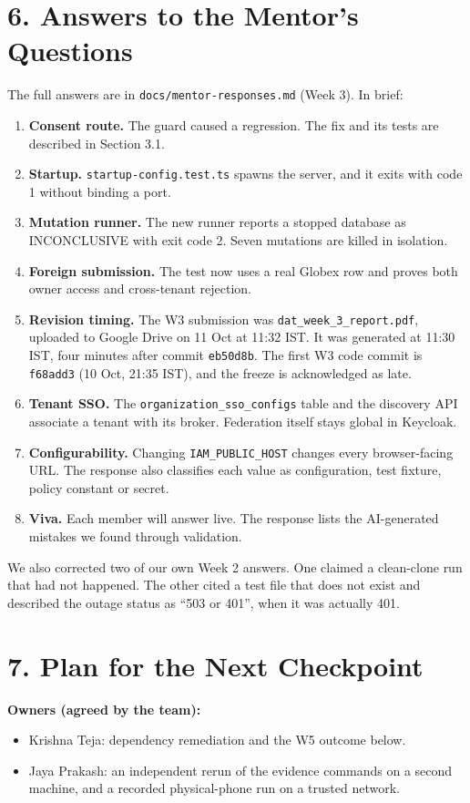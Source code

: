 \documentclass{article}
\begin{document}
\section*{6. Answers to the Mentor's Questions}
The full answers are in \texttt{docs/mentor-responses.md} (Week 3). In brief:
\begin{enumerate}
    \item \textbf{Consent route.} The guard caused a regression. The fix and its tests are described in Section 3.1.
    \item \textbf{Startup.} \texttt{startup-config.test.ts} spawns the server, and it exits with code 1 without binding a port.
    \item \textbf{Mutation runner.} The new runner reports a stopped database as INCONCLUSIVE with exit code 2. Seven mutations are killed in isolation.
    \item \textbf{Foreign submission.} The test now uses a real Globex row and proves both owner access and cross-tenant rejection.
    \item \textbf{Revision timing.} The W3 submission was \texttt{dat\_week\_3\_report.pdf}, uploaded to Google Drive on 11 Oct at 11:32 IST. It was generated at 11:30 IST, four minutes after commit \texttt{eb50d8b}. The first W3 code commit is \texttt{f68add3} (10 Oct, 21:35 IST), and the freeze is acknowledged as late.
    \item \textbf{Tenant SSO.} The \texttt{organization\_sso\_configs} table and the discovery API associate a tenant with its broker. Federation itself stays global in Keycloak.
    \item \textbf{Configurability.} Changing \texttt{IAM\_PUBLIC\_HOST} changes every browser-facing URL. The response also classifies each value as configuration, test fixture, policy constant or secret.
    \item \textbf{Viva.} Each member will answer live. The response lists the AI-generated mistakes we found through validation.
\end{enumerate}

We also corrected two of our own Week 2 answers. One claimed a clean-clone run that had not happened. The other cited a test file that does not exist and described the outage status as ``503 or 401'', when it was actually 401.

\section*{7. Plan for the Next Checkpoint}
\textbf{Owners (agreed by the team):}
\begin{itemize}
    \item Krishna Teja: dependency remediation and the W5 outcome below.
    \item Jaya Prakash: an independent rerun of the evidence commands on a second machine, and a recorded physical-phone run on a trusted network.
\end{itemize}
\end{document}
